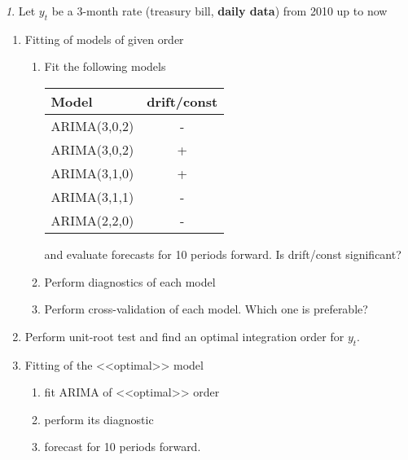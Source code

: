 \documentclass[12pt]{article}
\theoremstyle{remark}
\newtheorem{exercise}{}[section]
\begin{document}
\begin{exercise}
Let \(y_t\) be a 3-month rate (treasury bill,  \textbf{daily data}) from 2010 up to now
\begin{enumerate}
	\item Fitting of models of given order
	\begin{enumerate}
		\item Fit the following models
		\begin{center}\small
			\begin{tabular}{l|c}
				Model & drift/const \\ \hline
				ARIMA(3,0,2) & - \\
				ARIMA(3,0,2) & + \\
				ARIMA(3,1,0) & + \\
				ARIMA(3,1,1) & - \\
				ARIMA(2,2,0) & - \\ \hline
			\end{tabular}
		\end{center} 
		and evaluate forecasts for 10 periods forward. Is drift/const significant?
		\item Perform diagnostics of each model
		\item Perform cross-validation of each model. Which one is preferable?
	\end{enumerate}
	\item Perform unit-root test and find an optimal integration order for  \(y_t\). 
	\item Fitting of the <<optimal>> model
	\begin{enumerate}
		\item fit ARIMA of <<optimal>> order
		\item perform its diagnostic
		\item forecast for 10 periods forward.
	\end{enumerate}
\end{enumerate}
\end{exercise}
\end{document}
